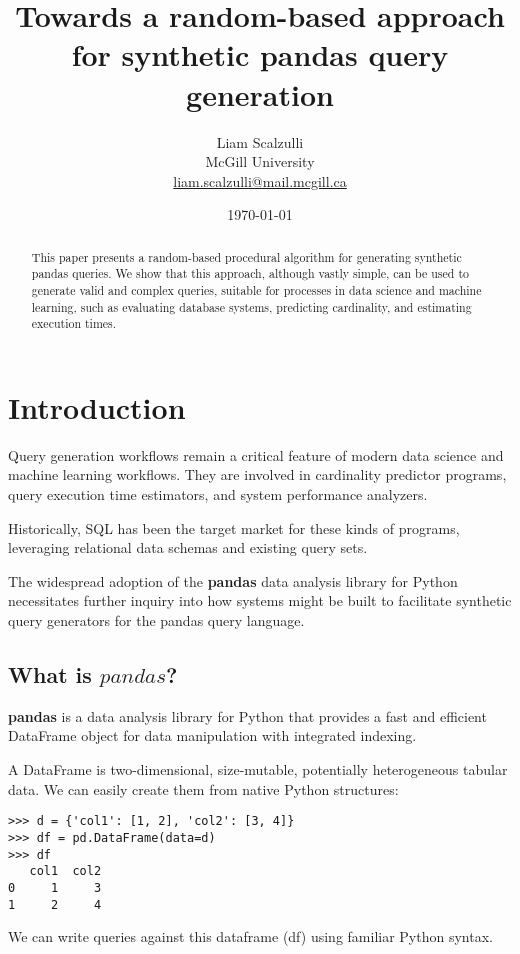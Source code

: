\documentclass[10pt, twocolumn]{article}
\title{Towards a random-based approach for synthetic pandas query generation}
\author{
  Liam Scalzulli \\
  McGill University \\
  \href{mailto:liam.scalzulli@mail.mcgill.ca}{liam.scalzulli@mail.mcgill.ca}
}
\date{\today}
\begin{document}
\maketitle

\begin{abstract}
  This paper presents a random-based procedural algorithm for generating synthetic pandas queries.
  We show that this approach, although vastly simple, can be used to generate valid and complex queries,
  suitable for processes in data science and machine learning, such as evaluating database systems,
  predicting cardinality, and estimating execution times.
\end{abstract}

\section{Introduction}

Query generation workflows remain a critical feature of modern data science and machine learning
workflows. They are involved in cardinality predictor programs, query execution time estimators,
and system performance analyzers.

\spacing
\noindent
Historically, SQL has been the target market for these kinds of programs, leveraging relational
data schemas and existing query sets.

\spacing
\noindent
The widespread adoption of the \textbf{pandas} data analysis library for Python necessitates
further inquiry into how systems might be built to facilitate synthetic query generators for the pandas query language.

\subsection*{What is $pandas$?}

\textbf{pandas} is a data analysis library for Python that provides a fast and efficient DataFrame object for data manipulation with integrated indexing.

\spacing
\noindent
A DataFrame is two-dimensional, size-mutable, potentially heterogeneous tabular data. We can easily create them from native Python structures:

\begin{verbatim}
>>> d = {'col1': [1, 2], 'col2': [3, 4]}
>>> df = pd.DataFrame(data=d)
>>> df
   col1  col2
0     1     3
1     2     4
\end{verbatim}

\noindent
We can write queries against this dataframe (df) using familiar Python syntax.
\end{document}
